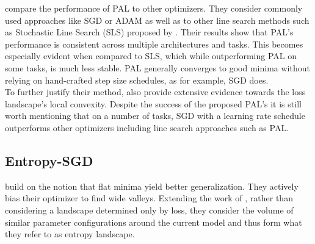 \documentclass[a4paper]{scrartcl}
\begin{document}
\citet{mutschler2020parabolic} compare the performance of PAL to other optimizers. They consider commonly used approaches like SGD or ADAM as well as to other line search methods such as Stochastic Line Search (SLS) proposed by \citet{paquette2018stochastic}. Their results show that PAL's performance is consistent across multiple architectures and tasks. This becomes especially evident when compared to SLS, which while outperforming PAL on some tasks, is much less stable. PAL generally converges to good minima without relying on hand-crafted step size schedules, as for example, SGD does.\\
To further justify their method, \cite{mutschler2020parabolic} also provide extensive evidence towards the loss landscape's local convexity. Despite the success of the proposed PAL's it is still worth mentioning that on a number of tasks, SGD with a learning rate schedule outperforms other optimizers including line search approaches such as PAL.



\subsection*{Entropy-SGD}
\citet{chaudhari2019entropy} build on the notion that flat minima yield better generalization. They actively bias their optimizer to find wide valleys. Extending the work of \citet{baldassi2016unreasonable}, rather than considering a landscape determined only by loss, they consider the volume of similar parameter configurations around the current model and thus form what they refer to as entropy landscape.
\end{document}
